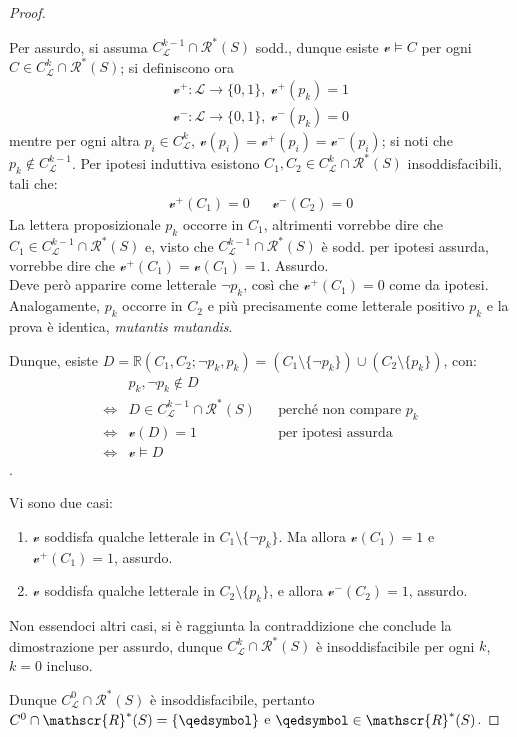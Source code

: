 \begin{proof}
\begin{itemize}
Per assurdo, si assuma $C^{k-1}_\mathscr{L} \cap \mathscr{R}^*(S)$ sodd., dunque esiste $\mathcal{v} \models C$ per ogni $C \in C^k_\mathscr{L} \cap \mathscr{R}^*(S)$; si definiscono ora 
\begin{align*}
\mathcal{v}^+ : \mathscr{L} \rightarrow \{0,1\},\ \mathcal{v}^+(p_k) = 1 \\
\mathcal{v}^- : \mathscr{L} \rightarrow \{0,1\},\ \mathcal{v}^-(p_k) = 0
\end{align*}
mentre per ogni altra $p_i \in C^k_\mathscr{L}$, $\mathcal{v}(p_i) = \mathcal{v}^+(p_i) = \mathcal{v}^-(p_i)$; si noti che $p_k \notin C^{k-1}_\mathscr{L}$. 
Per ipotesi induttiva esistono $C_1, C_2 \in C^k_\mathscr{L} \cap \mathscr{R}^*(S)$ insoddisfacibili, tali che:
\begin{align*}
\mathcal{v}^+(C_1) = 0 && \mathcal{v}^-(C_2) = 0
\end{align*}
La lettera proposizionale $p_k$ occorre in $C_1$, altrimenti vorrebbe dire che $C_1 \in C^{k-1}_\mathscr{L} \cap \mathscr{R}^*(S)$ e, visto che $C^{k-1}_\mathscr{L} \cap \mathscr{R}^*(S)$ è sodd. per ipotesi assurda, vorrebbe dire che $\mathcal{v}^+(C_1) = \mathcal{v}(C_1) = 1$. Assurdo. \\
Deve però apparire come letterale $\neg p_k$, così che $\mathcal{v}^+(C_1) = 0$ come da ipotesi. \\
Analogamente, $p_k$ occorre in $C_2$ e più precisamente come letterale positivo $p_k$ e la prova è identica, \textit{mutantis mutandis}. 

Dunque, esiste $D = \mathbb{R}(C_1, C_2; \neg p_k, p_k) = (C_1 \setminus \{ \neg p_k\}) \cup (C_2 \setminus \{p_k\})$, con:
\begin{align*}
& p_k, \neg p_k \notin D \\
\iff & D \in C^{k-1}_\mathscr{L} \cap \mathscr{R}^*(S) && \text{perché non compare } p_k \\
\iff & \mathcal{v}(D) = 1 && \text{per ipotesi assurda} \\
\iff & \mathcal{v} \models D
\end{align*}.

Vi sono due casi:
\begin{enumerate}
  \item $\mathcal{v}$ soddisfa qualche letterale in $C_1 \setminus \{\neg p_k\}$. Ma allora $\mathcal{v}(C_1) = 1$ e $\mathcal{v}^+(C_1) = 1$, assurdo.
  \item $\mathcal{v}$ soddisfa qualche letterale in $C_2 \setminus \{p_k\}$, e allora $\mathcal{v}^-(C_2) = 1$, assurdo.
\end{enumerate}
Non essendoci altri casi, si è raggiunta la contraddizione che conclude la dimostrazione per assurdo, dunque $C^k_\mathscr{L} \cap \mathscr{R}^*(S)$ è
insoddisfacibile per ogni $k$, $k=0$ incluso.
\end{itemize}
Dunque $C^0_\mathscr{L} \cap \mathscr{R}^*(S)$ è insoddisfacibile, pertanto $C^0 \cap \mathscr{R}^*(S) = \{\qedsymbol\}$ e $\qedsymbol \in \mathscr{R}^*(S)$.
\end{proof}

